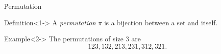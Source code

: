 \begin{frame}{Permutation}
    \begin{block}{Definition}<1->
    A \emph{permutation} $\pi$ is a bijection between a set and itself.
    \end{block}
    \begin{block}{Example}<2->
        The permutations of size $3$ are
        \[
            123, 132, 213, 231, 312, 321.
        \]
    \end{block}
\end{frame}